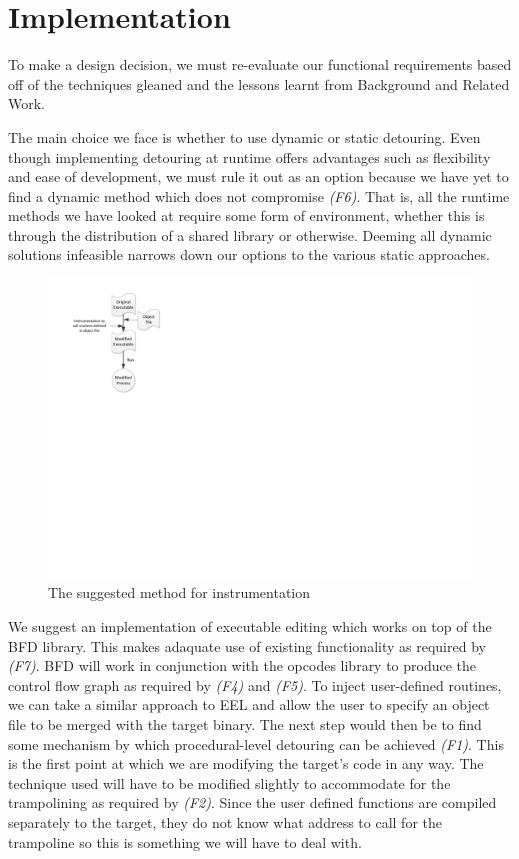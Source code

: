 \section{Implementation}

To make a design decision, we must re-evaluate our functional requirements based off of the techniques gleaned and the lessons learnt from Background and Related Work.

The main choice we face is whether to use dynamic or static detouring. Even though implementing detouring at runtime offers advantages such as flexibility and ease of development, we must rule it out as an option because we have yet to find a dynamic method which does not compromise \emph{(F6)}. That is, all the runtime methods we have looked at require some form of environment, whether this is through the distribution of a shared library or otherwise. Deeming all dynamic solutions infeasible narrows down our options to the various static approaches.

\begin{figure}[H]
 \centering
 \includegraphics[viewport=49 370 223 569]{Workflow.pdf}
 \caption[Hierarchy]{The suggested method for instrumentation}
\end{figure}

We suggest an implementation of executable editing which works on top of the BFD library. This makes adaquate use of existing functionality as required by \emph{(F7)}. BFD will work in conjunction with the opcodes library to produce the control flow graph as required by \emph{(F4)} and \emph{(F5)}. To inject user-defined routines, we can take a similar approach to EEL and allow the user to specify an object file to be merged with the target binary. The next step would then be to find some mechanism by which procedural-level detouring can be achieved \emph{(F1)}. This is the first point at which we are modifying the target's code in any way. The technique used will have to be modified slightly to accommodate for the trampolining as required by \emph{(F2)}. Since the user defined functions are compiled separately to the target, they do not know what address to call for the trampoline so this is something we will have to deal with.

